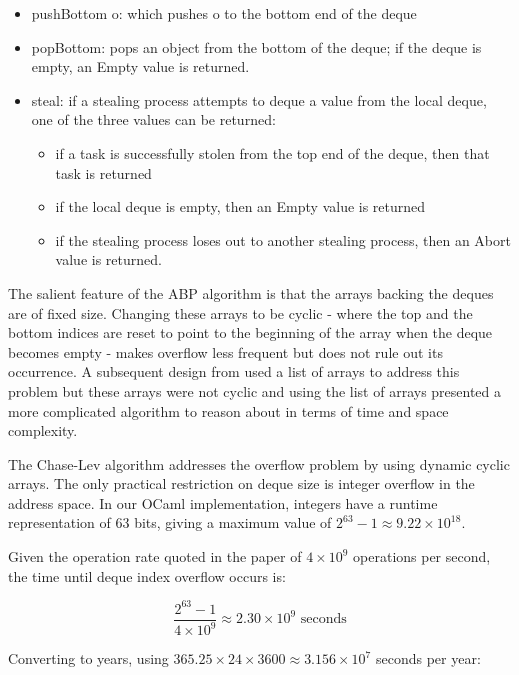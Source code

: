 \documentclass[11pt,a4paper]{article}
\begin{document}
\begin{itemize}[noitemsep, nosep]
    \item pushBottom o: which pushes o to the bottom end of the deque
    \item popBottom: pops an object from the bottom of the deque; if the
        deque is empty, an Empty value is returned.
    \item steal: if a stealing process attempts to deque a value from the local
        deque, one of the three values can be returned:
       \begin{itemize}[noitemsep]
           \item if a task is successfully stolen from the top end of the deque,
                 then that task is returned
           \item if the local deque is empty, then an Empty value is returned
           \item if the stealing process loses out to another stealing process,
                 then an Abort value is returned.
      \end{itemize}
\end{itemize}

The salient feature of the ABP algorithm is that the arrays backing the deques
are of fixed size. Changing these arrays to be cyclic - where the top and
the bottom indices are reset to point to the beginning of the array when the
deque becomes empty - makes overflow less frequent but does not rule out its
occurrence. A subsequent design from \cite{hendler2005dynamic} used a list of
arrays to address this problem but these arrays were not cyclic and using the
list of arrays presented a more complicated algorithm to reason about in
terms of time and space complexity.

The Chase-Lev algorithm addresses the overflow problem by using dynamic cyclic
arrays. The only practical restriction on deque size is integer overflow in the
address space.  In our OCaml implementation, integers have a runtime
representation of 63 bits, giving a maximum value of
$2^{63} - 1 \approx 9.22 \times 10^{18}$.

Given the operation rate quoted in the paper of $4 \times 10^{9}$ operations per second,
the time until deque index overflow occurs is:

\[
\frac{2^{63} - 1}{4 \times 10^{9}} \approx 2.30 \times 10^{9} \text{ seconds}
\]

Converting to years, using $365.25 \times 24 \times 3600 \approx 3.156 \times 10^{7}$
seconds per year:
\end{document}
